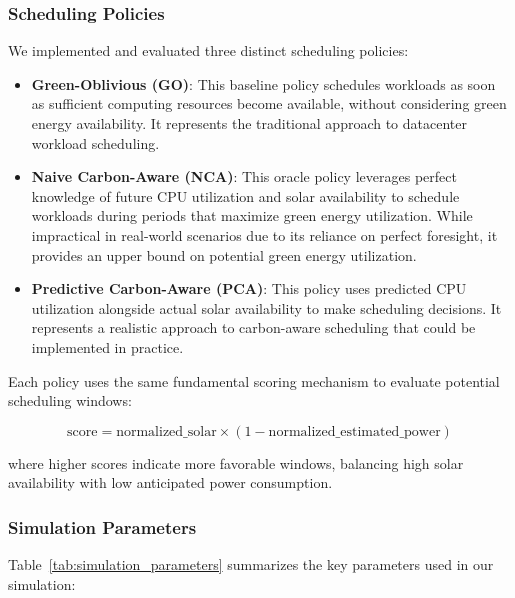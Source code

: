 \subsubsection{Scheduling Policies}
We implemented and evaluated three distinct scheduling policies:

\begin{itemize}
    \item \textbf{Green-Oblivious (GO)}: This baseline policy schedules workloads as soon as sufficient computing resources become available, without considering green energy availability. It represents the traditional approach to datacenter workload scheduling.
    
    \item \textbf{Naive Carbon-Aware (NCA)}: This oracle policy leverages perfect knowledge of future CPU utilization and solar availability to schedule workloads during periods that maximize green energy utilization. While impractical in real-world scenarios due to its reliance on perfect foresight, it provides an upper bound on potential green energy utilization.
    
    \item \textbf{Predictive Carbon-Aware (PCA)}: This policy uses predicted CPU utilization alongside actual solar availability to make scheduling decisions. It represents a realistic approach to carbon-aware scheduling that could be implemented in practice.
\end{itemize}

Each policy uses the same fundamental scoring mechanism to evaluate potential scheduling windows:

\begin{equation}
\text{score} = \text{normalized\_solar} \times (1 - \text{normalized\_estimated\_power})
\end{equation}

where higher scores indicate more favorable windows, balancing high solar availability with low anticipated power consumption.

\subsubsection{Simulation Parameters}
Table~\ref{tab:simulation_parameters} summarizes the key parameters used in our simulation:


